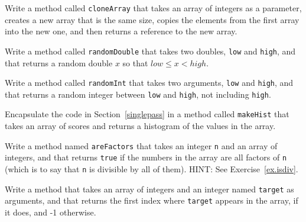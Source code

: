 \begin{exercise}
Write a method called {\tt cloneArray} that takes an
array of integers as a parameter, creates a new array that is the same
size, copies the elements from the first array into the new one, and
then returns a reference to the new array.
\end{exercise}


\begin{exercise}
Write a method called {\tt randomDouble} that takes two doubles,
{\tt low} and {\tt high}, and that returns a random double $x$
so that $low \le x < high$.
\end{exercise}


\begin{exercise}
\label{ex.randint}
Write a method called {\tt randomInt} that takes two arguments,
{\tt low} and {\tt high}, and that returns a random integer between
{\tt low} and {\tt high}, not including {\tt high}.
\end{exercise}


\begin{exercise}
Encapsulate the code in Section~\ref{singlepass} in a method called
{\tt makeHist} that takes an array of scores and returns a histogram
of the values in the array.
\end{exercise}


\begin{exercise}
Write a method named {\tt areFactors} that takes
an integer {\tt n} and an array of integers, and that returns
{\tt true} if the numbers in the array are all factors of {\tt n}
(which is to say that {\tt n} is divisible by all of them).
HINT: See Exercise~\ref{ex.isdiv}.
\end{exercise}


\begin{exercise}
Write a method that takes an array of integers and an integer named
{\tt target} as arguments, and that returns the first index where
{\tt target} appears in the array, if it does, and -1 otherwise.
\end{exercise}


